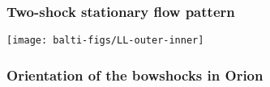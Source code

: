 \documentclass[presentation]{beamer}
\begin{document}
\begin{frame}
  \frametitle{Two-shock stationary flow pattern}
  \centering\texttt{[image: balti-figs/LL-outer-inner]}
\end{frame}

\begin{frame}
  \frametitle{Orientation of the bowshocks in Orion}
  \centering
\end{frame}
\end{document}
